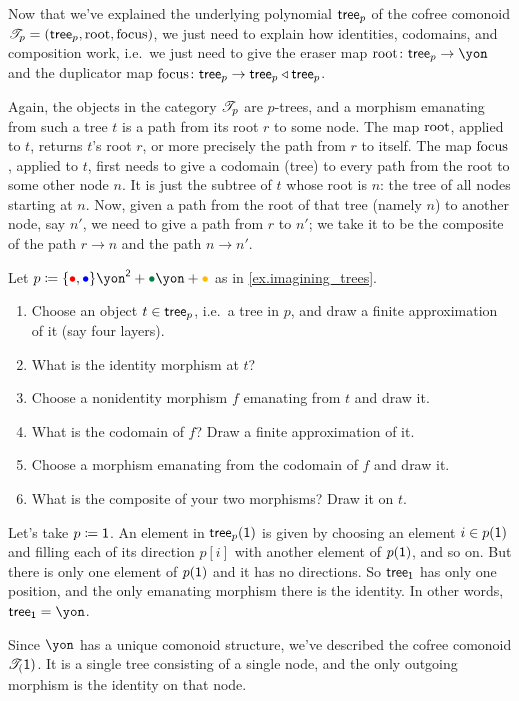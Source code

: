 \documentclass[Book-Poly]{subfiles}
\begin{document}
Now that we've explained the underlying polynomial $\mathsf{tree}_p$ of the cofree comonoid $\mathscr{T}_{p}=(\mathsf{tree}_p,\mathrm{root},\mathrm{focus})$, we just need to explain how identities, codomains, and composition work, i.e.\ we just need to give the eraser map $\rt\colon\tr_p\to\yon$ and the duplicator map $\mathrm{focus}\colon\mathsf{tree}_p\to\mathsf{tree}_p\mathbin{\triangleleft}\mathsf{tree}_p$. 

Again, the objects in the category $\mathscr{T}_{p}$ are $p$-trees, and a morphism emanating from such a tree $t$ is a path from its root $r$ to some node. The map $\mathrm{root}$, applied to $t$, returns $t$'s root $r$, or more precisely the path from $r$ to itself. The map $\mathrm{focus}$, applied to $t$, first needs to give a codomain (tree) to every path from the root to some other node $n$. It is just the subtree of $t$ whose root is $n$: the tree of all nodes starting at $n$. Now, given a path from the root of that tree (namely $n$) to another node, say $n'$, we need to give a path from $r$ to $n'$; we take it to be the composite of the path $r\to n$ and the path $n\to n'$.

\begin{exercise}
Let $p\coloneqq\{\bul[red],\bul[blue]\}\yon^\2+\bul[dgreen]\yon+\bul[dyellow]$ as in \cref{ex.imagining_trees}.
\begin{enumerate}
	\item Choose an object $t\in \mathsf{tree}_p$, i.e.\ a tree in $p$, and draw a finite approximation of it (say four layers).
	\item What is the identity morphism at $t$?
	\item Choose a nonidentity morphism $f$ emanating from $t$ and draw it.
	\item What is the codomain of $f$? Draw a finite approximation of it.
	\item Choose a morphism emanating from the codomain of $f$ and draw it.
	\item What is the composite of your two morphisms? Draw it on $t$.
\qedhere
\end{enumerate}
\end{exercise}

\begin{example}
Let's take $p\coloneqq\textsf{1}$. An element in $\mathsf{tree}_p(\textsf{1})$ is given by choosing an element $i\in p(\textsf{1})$ and filling each of its direction $p[i]$ with another element of $p(\textsf{1})$, and so on. But there is only one element of $p(\textsf{1})$ and it has no directions. So $\mathsf{tree}_{\textsf{1}}$ has only one position, and the only emanating morphism there is the identity. In other words, $\tr_\1=\yon$.

Since $\yon$ has a unique comonoid structure, we've described the cofree comonoid $\mathscr{T}_{(}\textsf{1})$. It is a single tree consisting of a single node, and the only outgoing morphism is the identity on that node.
\end{example}
\end{document}
